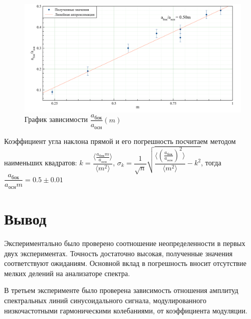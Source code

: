 \documentclass[a4paper, 12pt]{article}
\begin{document}
\begin{figure}[H]
\centering
\includegraphics[width = \textwidth]{GraphC}
\caption{График зависимости $\dfrac{a_\text{бок}}{a_\text{осн}}(m)$}
\end{figure}

Коэффициент угла наклона прямой и его погрешность посчитаем методом наименьших квадратов: $k = \dfrac{\langle \frac{a_\text{бок} m}{a_\text{осн}}  \rangle}{\langle m^2 \rangle}$, $\sigma_k = \dfrac{1}{\sqrt{n}} \sqrt{\dfrac{\langle \left( \frac{a_\text{бок}}{a_\text{осн}}\right)^2 \rangle}{\langle m^2 \rangle} - k^2}$, тогда $\dfrac{a_\text{бок}}{a_\text{осн} m} = 0.5 \pm 0.01$

\section{Вывод}

Экспериментально было проверено соотношение неопределенности в первых двух экспериментах. Точность достаточно высокая, полученные значения соответствуют ожиданиям. Основной вклад в погрешность вносит отсутствие мелких делений на анализаторе спектра.

В третьем эксперименте было проверена зависимость отношения амплитуд спектральных линий синусоидального сигнала, модулированного низкочастотными гармоническими колебаниями, от коэффициента модуляции.
\end{document}

